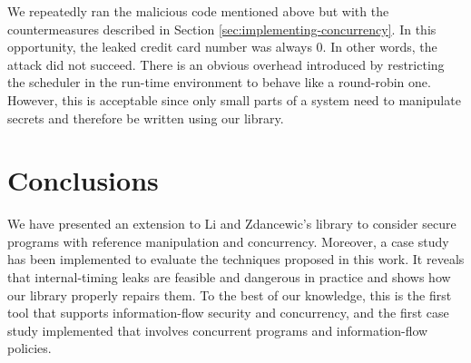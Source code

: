 \documentclass[times, 10pt,twocolumn]{article}
\begin{document}
{We repeatedly ran the malicious code mentioned above but with 
the countermeasures described 
in Section \ref{sec:implementing-concurrency}. 
In this opportunity, the leaked credit card number was always $0$. 
In other words, the attack did 
not succeed. There is an obvious overhead introduced by restricting the
scheduler in the run-time environment to behave like a round-robin
one. 
However, this is acceptable since only small parts of a system need to
manipulate secrets and therefore be written using our library.





 






\section{Conclusions} \label{sec:conclusions}

We have presented an extension to Li and Zdancewic's library to 
consider secure programs with reference manipulation and concurrency.
Moreover, a case study  has been implemented to evaluate the techniques 
proposed in this work.
It reveals that internal-timing
leaks are feasible and dangerous in practice and shows how  
our library properly repairs them. 
To the best of our knowledge, this is the first tool that supports
information-flow security and concurrency, and the first case study implemented
that involves concurrent programs and information-flow policies. 

}
\end{document}
